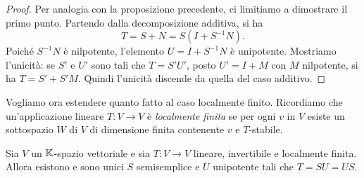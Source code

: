\begin{proof}
    Per analogia con la proposizione precedente, ci limitiamo a dimostrare il primo punto. Partendo dalla decomposizione additiva, si ha \[T=S+N=S(I+S^{-1}N).\] Poiché $S^{-1}N$ è nilpotente, l'elemento $U=I+S^{-1}N$ è unipotente. Mostriamo l'unicità: se $S'$ e $U'$ sono tali che $T=S'U'$, posto $U'=I+M$ con $M$ nilpotente, si ha $T=S'+S'M$. Quindi l'unicità discende da quella del caso additivo.
\end{proof}
Vogliamo ora estendere quanto fatto al caso localmente finito. Ricordiamo che un'applicazione lineare $T\colon V\to V$ è \emph{localmente finita} se per ogni $v$ in $V$ esiste un sottospazio $W$ di $V$ di dimensione finita contenente $v$ e $T$-stabile.
\begin{theorem}
    Sia $V$ un $\mathbb{K}$-spazio vettoriale e sia $T\colon V\to V$ lineare, invertibile e localmente finita. Allora esistono e sono unici $S$ semisemplice e $U$ unipotente tali che $T=SU=US$.
\end{theorem}
